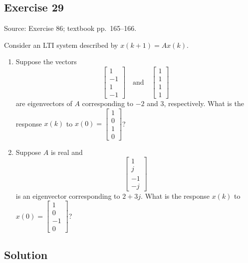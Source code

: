 \documentclass[12pt,a4paper]{article}
\newlength{\questionroom}
\newenvironment{questionprompt}{%
  \begin{lrbox}{\questionbox}\begin{minipage}{\linewidth}%
}{%
  \end{minipage}\end{lrbox}%
  \setlength{\questionroom}{\dimexpr\ht\questionbox+\dp\questionbox+5.2cm\relax}%
  \ifdim\questionroom>\textheight\setlength{\questionroom}{\textheight}\fi
  \Needspace{\questionroom}%
  \noindent\usebox{\questionbox}\par
}
\begin{document}
\begin{questionprompt}
\section*{Exercise 29}
\label{practice:29}
{\small Source: Exercise 86; textbook pp.~165--166.}\par
Consider an LTI system described by $x(k+1)=Ax(k)$.
\begin{enumerate}[label=(\alph*)]
\item Suppose the vectors
\[\begin{bmatrix}1\\-1\\1\\-1\end{bmatrix}\quad\text{and}\quad\begin{bmatrix}1\\1\\1\\1\end{bmatrix}\]
are eigenvectors of $A$ corresponding to $-2$ and $3$, respectively. What is the response $x(k)$ to $x(0)=\begin{bmatrix}1\\0\\1\\0\end{bmatrix}$?
\item Suppose $A$ is real and
\[\begin{bmatrix}1\\j\\-1\\-j\end{bmatrix}\]
is an eigenvector corresponding to $2+3j$. What is the response $x(k)$ to $x(0)=\begin{bmatrix}1\\0\\-1\\0\end{bmatrix}$?
\end{enumerate}
\end{questionprompt}
\subsection*{Solution}
\vspace{3.5cm}
\end{document}

